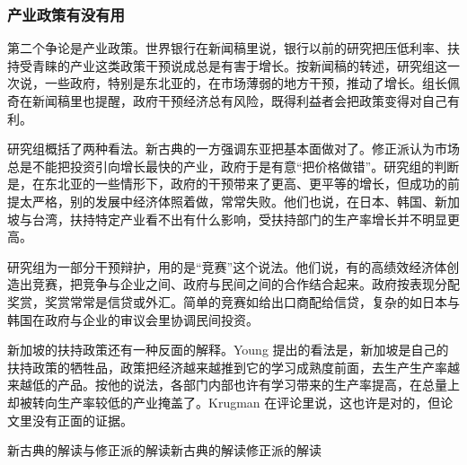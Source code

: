 \subsubsection{产业政策有没有用}

第二个争论是产业政策。世界银行在新闻稿里说，银行以前的研究把压低利率、扶持受青睐的产业这类政策干预说成总是有害于增长\cite{worldbank1993news}。按新闻稿的转述，研究组这一次说，一些政府，特别是东北亚的，在市场薄弱的地方干预，推动了增长\cite{worldbank1993news}。组长佩奇在新闻稿里也提醒，政府干预经济总有风险，既得利益者会把政策变得对自己有利\cite{worldbank1993news}。

研究组概括了两种看法\cite{worldbank1993}。新古典的一方强调东亚把基本面做对了\cite{worldbank1993}。修正派认为市场总是不能把投资引向增长最快的产业，政府于是有意“把价格做错”\cite{worldbank1993}。研究组的判断是，在东北亚的一些情形下，政府的干预带来了更高、更平等的增长，但成功的前提太严格，别的发展中经济体照着做，常常失败\cite{worldbank1993}。他们也说，在日本、韩国、新加坡与台湾，扶持特定产业看不出有什么影响，受扶持部门的生产率增长并不明显更高\cite{worldbank1993}。

研究组为一部分干预辩护，用的是“竞赛”这个说法。他们说，有的高绩效经济体创造出竞赛，把竞争与企业之间、政府与民间之间的合作结合起来\cite{worldbank1993}。政府按表现分配奖赏，奖赏常常是信贷或外汇\cite{worldbank1993}。简单的竞赛如给出口商配给信贷，复杂的如日本与韩国在政府与企业的审议会里协调民间投资\cite{worldbank1993}。

新加坡的扶持政策还有一种反面的解释。Young 提出的看法是，新加坡是自己的扶持政策的牺牲品，政策把经济越来越推到它的学习成熟度前面，去生产生产率越来越低的产品\cite{young1992}。按他的说法，各部门内部也许有学习带来的生产率提高，在总量上却被转向生产率较低的产业掩盖了\cite{young1992}。Krugman 在评论里说，这也许是对的，但论文里没有正面的证据\cite{young1992}。

\begin{compare}{新古典的解读与修正派的解读}{新古典的解读}{修正派的解读}
\end{compare}

